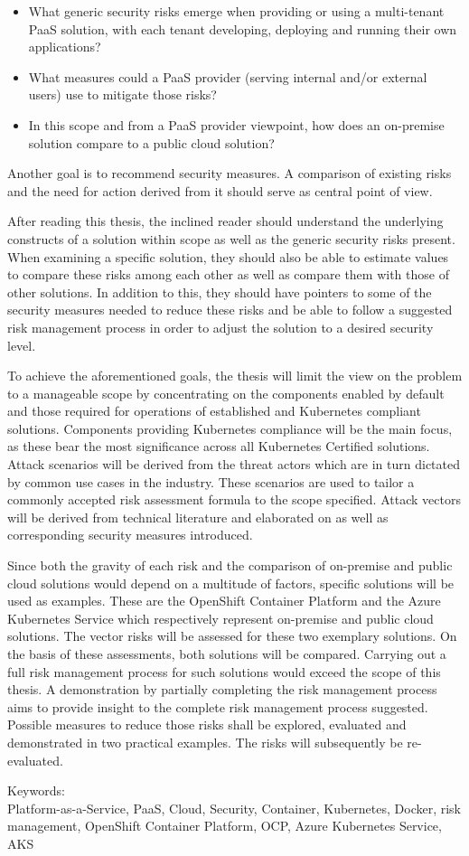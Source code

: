 \begin{itemize}

\item What generic security risks emerge when providing or using a multi-tenant PaaS solution,
with each tenant developing, deploying and running their own applications? 

\item What measures could a PaaS provider (serving internal and/or external users) use to mitigate those risks? 

\item  In this scope and from a PaaS provider viewpoint, how does an on-premise solution compare
to a public cloud solution? 

\end{itemize}

Another goal is to recommend security measures.
A comparison of existing risks and the need for action derived from it should serve as central point of view. 


After reading this thesis, the inclined reader should understand the underlying constructs of a solution within scope as well as the generic security risks present. When examining a specific solution, they should also be able to estimate values to compare these risks among each other as well as compare them with those of other solutions. In addition to this, they should have pointers to some of the security measures needed to reduce these risks and be able to follow a suggested risk management process in order to adjust the solution to a desired security level.


To achieve the aforementioned goals, the thesis will limit the view on the problem to a manageable scope by
concentrating on the components enabled by default and those required for operations of established and Kubernetes compliant solutions.
Components providing Kubernetes compliance will be the main focus, as these bear the most significance across all Kubernetes Certified solutions. 
Attack scenarios will be derived from the threat actors which are in turn dictated by common use cases in the industry.
These scenarios are used to tailor a commonly accepted risk assessment formula to the scope specified.
Attack vectors will be derived from technical literature and elaborated on as well as corresponding security measures introduced.


Since both the gravity of each risk and the comparison of on-premise and public cloud solutions would depend on a multitude of factors, specific solutions will be used as examples. These are the OpenShift Container Platform and the Azure Kubernetes Service which respectively represent on-premise and public cloud solutions.
The vector risks will be assessed for these two exemplary solutions.
On the basis of these assessments, both solutions will be compared.
Carrying out a full risk management process for such solutions would exceed the scope of this thesis.
A demonstration by partially completing the risk management process aims to provide insight to the complete risk management process suggested.
Possible measures to reduce those risks shall be explored, evaluated and demonstrated in two practical examples.
The risks will subsequently be re-evaluated.

\bigskip

\noindent
Keywords: \\
Platform-as-a-Service, PaaS, Cloud, Security, Container, Kubernetes, Docker, risk management, OpenShift Container Platform, OCP, Azure Kubernetes Service, AKS

